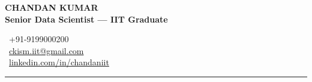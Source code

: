\documentclass[a4paper,9pt]{article}
\begin{document}
\begin{minipage}[t]{0.6\textwidth}
  {\fontsize{16pt}{18pt}\selectfont\textbf{CHANDAN KUMAR}} \\[2pt]
  \textcolor{primary}{\textbf{Senior Data Scientist --- IIT Graduate}}
\end{minipage}%
\begin{minipage}[t]{0.4\textwidth}
  \begin{flushright}\small
    \textcolor{primary}{}~+91-9199000200 \\[2pt]
    \textcolor{primary}{}~\href{mailto:ckism.iit@gmail.com}{ckism.iit@gmail.com} \\[2pt]
    \textcolor{primary}{}~\href{https://www.linkedin.com/in/chandaniit}{linkedin.com/in/chandaniit}
  \end{flushright}
\end{minipage}

\vspace{4pt}
\textcolor{primary}{\hrule height 1.5pt}
\vspace{4pt}
\end{document}
